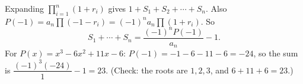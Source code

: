 Expanding $\prod_{i=1}^n(1+r_i)$ gives $1+S_1+S_2+\cdots+S_n$. Also $P(-1)=a_n\prod(-1-r_i)=(-1)^na_n\prod(1+r_i)$. So
\[S_1+\cdots+S_n=\boxed{\dfrac{(-1)^nP(-1)}{a_n}-1}.\]
For $P(x)=x^3-6x^2+11x-6$: $P(-1)=-1-6-11-6=-24$, so the sum is $\dfrac{(-1)^3(-24)}{1}-1=23$. (Check: the roots are $1,2,3$, and $6+11+6=23$.)
